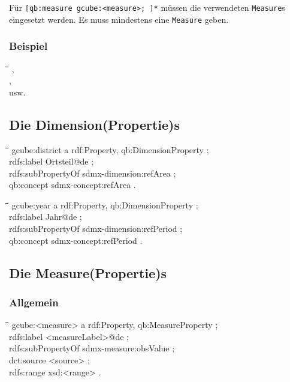 \documentclass[a4paper,11pt]{article}
\newenvironment{code}{\tt \begin{tabbing}
\hskip12pt\=\hskip12pt\=\hskip12pt\=\hskip12pt\=\hskip5cm\=\hskip5cm\=\kill}
{\end{tabbing}}
\begin{document}
Für \texttt{[qb:measure gcube:<measure>; ]*} müssen die verwendeten
\texttt{Measure}s eingesetzt werden. Es muss mindestens eine \texttt{Measure}
geben.
\subsubsection{Beispiel}
\begin{code}
\>,\\{}
\>,\\{}
        usw.
\end{code}

\subsection{Die Dimension(Propertie)s}

\begin{code}
gcube:district a rdf:Property, qb:DimensionProperty ;\+\\
    rdfs:label {\dq}Ortsteil{\dq}@de ;\\
    rdfs:subPropertyOf sdmx-dimension:refArea ;\\
    qb:concept sdmx-concept:refArea .
\end{code}
\begin{code}
gcube:year a rdf:Property, qb:DimensionProperty ;\+\\
    rdfs:label {\dq}Jahr{\dq}@de ;\\
    rdfs:subPropertyOf sdmx-dimension:refPeriod ;\\
    qb:concept sdmx-concept:refPeriod .\\
\end{code}

\subsection{Die Measure(Propertie)s} \label{Measures}

\subsubsection{Allgemein}
\begin{code}           
gcube:<measure> a rdf:Property, qb:MeasureProperty ;\+\\
    rdfs:label {\dq}<measureLabel>{\dq}@de ;\\
    rdfs:subPropertyOf sdmx-measure:obsValue ;\\
    dct:source <source> ;\\
    rdfs:range xsd:<range> .
\end{code}
\end{document}
